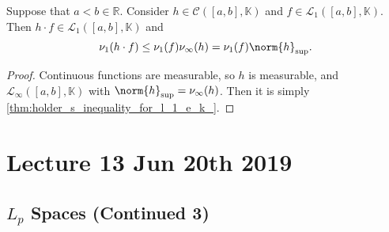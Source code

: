 \documentclass[notoc,notitlepage]{tufte-book}
\begin{document}
\begin{crly}\label{crly:holder_s_inequality_for_continuous_functions}
  Suppose that $a < b \in \mathbb{R}$.
  Consider $h \in \mathcal{C}([a, b], \mathbb{K})$
  and $f \in \mathcal{L}_1([a, b], \mathbb{K})$.
  Then $h \cdot f \in \mathcal{L}_1([a, b], \mathbb{K})$ and
  \begin{equation*}
    \nu_1(h \cdot f) \leq \nu_1(f) \nu_\infty(h) = \nu_1(f) \norm{h}_{\sup}.
  \end{equation*}
\end{crly}

\begin{proof}
  Continuous functions are measurable, so $h$ is measurable, and
  $\mathcal{L}_\infty([a, b], \mathbb{K})$
  with $\norm{h}_{\sup} = \nu_\infty(h)$.
  Then it is simply \cref{thm:holder_s_inequality_for_l_1_e_k_}.
\end{proof}




\chapter{Lecture 13 Jun 20th 2019}%
\label{chp:lecture_13_jun_20th_2019}

\section{\texorpdfstring{$L_p$}{Lp} Spaces (Continued 3)}%
\label{sec:_l_p_spaces_continued_3}
\end{document}
